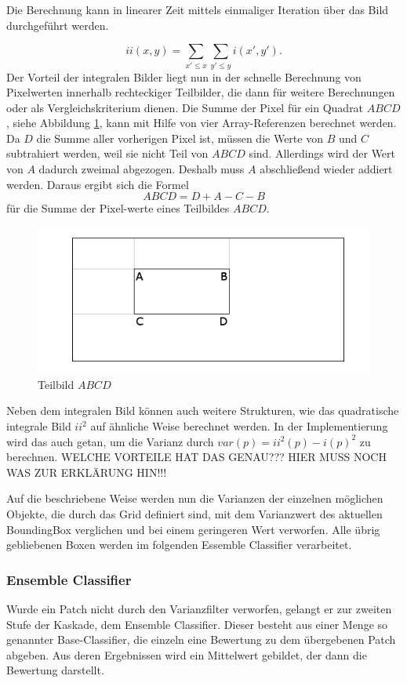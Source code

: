 	Die Berechnung kann in linearer Zeit mittels einmaliger Iteration über das Bild durchgeführt werden.

	$$ ii(x,y)=\underset{x'\leq x}{\sum}\underset{y'\leq y}{\sum}i(x',y'). $$
	Der Vorteil der integralen Bilder liegt nun in der schnelle Berechnung von Pixelwerten innerhalb rechteckiger Teilbilder, die dann für weitere Berechnungen oder als Vergleichskriterium dienen. Die Summe der Pixel für ein Quadrat $ABCD$, siehe Abbildung \ref{Subwindow}, kann mit Hilfe von vier Array-Referenzen berechnet werden. Da $D$ die Summe aller vorherigen Pixel ist, müssen die Werte von $B$ und $C$ subtrahiert werden, weil sie nicht Teil von $ABCD$ sind. Allerdings wird der Wert von $A$ dadurch zweimal abgezogen. Deshalb muss $A$ abschließend wieder addiert werden. Daraus ergibt sich die Formel $$ABCD=D+A-C-B$$ für die Summe der Pixel-werte eines Teilbildes $ABCD$.

	\begin{figure}
	\centering{}\includegraphics[scale=0.7]{../pictures/IntegralImage.png}\caption{Teilbild $ABCD$}
	\label{Subwindow}
	\end{figure}

	Neben dem integralen Bild können auch weitere Strukturen, wie das quadratische integrale Bild $ii^{2}$ auf ähnliche Weise berechnet werden. In der Implementierung wird das auch getan, um die Varianz durch $var(p)=ii^{2}(p)-i(p)^{2}$ zu berechnen. WELCHE VORTEILE HAT DAS GENAU??? HIER MUSS NOCH WAS ZUR ERKLÄRUNG HIN!!!

	Auf die beschriebene Weise werden nun die Varianzen der einzelnen möglichen Objekte, die durch das Grid definiert sind, mit dem Varianzwert des aktuellen BoundingBox verglichen und bei einem geringeren Wert verworfen. Alle übrig gebliebenen Boxen werden im folgenden Essemble Classifier verarbeitet.

	\subsubsection{Ensemble Classifier}
	Wurde ein Patch nicht durch den Varianzfilter verworfen, gelangt er zur zweiten Stufe der Kaskade, dem Ensemble Classifier. Dieser besteht aus einer Menge so genannter Base-Classifier, die einzeln eine Bewertung zu dem übergebenen Patch abgeben. Aus deren Ergebnissen wird ein Mittelwert gebildet, der dann die Bewertung darstellt.

